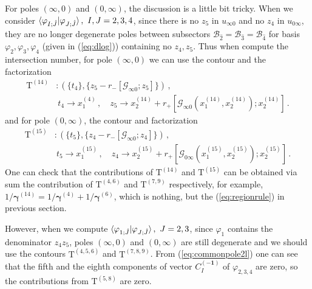 \documentclass[a4paper,11pt]{article}
\newcommand{\nn}{\nonumber}
\newcommand{\nT}{\mathrm{T}}
\newcommand{\mG}{\mathcal{G}}
\def\eref#1{(\ref{#1})}
\begin{document}
For poles $(\infty,0)$ and $(0,\infty)$, the discussion is a little bit tricky. When we consider $\braket{\varphi_{I;\hat{J}}|\varphi_{J;\hat{J}}},\  I,J=2,3,4$, since there is no $z_5$ in $u_{\infty 0 }$ and no $z_4$ in $u_{0 \infty }$, they are no longer degenerate poles  between subsectors $\mathcal{B}_{\hat{2}}=\mathcal{B}_{\hat{3}}=\mathcal{B}_{\hat{4}}$ for basis $\varphi_{2}, \varphi_{3},\varphi_{4}$ (given in \eref{eq:dlog}) containing no $z_4, z_5$. 
Thus when compute the intersection number, for pole $(\infty,0)$ we can use  the contour 
and the factorization 
 \begin{align}
\nT^{(14)} &: (\{t_4\} , \{z_5-r_-[\mG_{\infty0};z_5]\}) \,,\nn\\
&~t_4 \to x_1^{(4)} \,, \quad z_5\to  x_2^{(14)} +  r_{+}[\mG_{\infty0}(x_1^{(14)},x_2^{(14)});x_2^{(14)}] \,.
\end{align}
and  for pole $(0,\infty)$, the contour and factorization   
\begin{align}
\nT^{(15)} &: (\{t_5\} , \{z_4-r_-[\mG_{\infty0};z_4]\}) \,,\nn\\
&~t_5 \to x_1^{(15)} \,, \quad z_4\to  x_2^{(15)} +  r_{+}[\mG_{0\infty}(x_1^{(15)},x_2^{(15)});x_2^{(15)}] \,.
\end{align}
%
One can check that the contributions of  $\nT^{(14)}$ and $\nT^{(15)}$ can be obtained via sum the contribution of $\nT^{(4,6)}$
and $\nT^{(7,9)}$ respectively, for example, $1/\bm{\gamma}^{(14)} = 1/\bm{\gamma}^{(4)} +1/\bm{\gamma}^{(6)}$, which is nothing, but the \eref{eq:regionrule} in previous section.

However, when we compute $\braket{\varphi_{1;\hat{J}}|\varphi_{J;\hat{J}}},\  J=2,3$, since $\varphi_{1}$ contains
the denominator $z_4z_5$, poles $(\infty,0)$ and $(0,\infty)$ are still degenerate and we should use the 
contours $\nT^{(4,5,6)}$
and $\nT^{(7,8,9)}$. From \eref{eq:commonpole2l} one can see that the fifth and the eighth components of vector $C^{(\bm{-1})}_I$ of $\varphi_{2,3,4}$ are zero, so the contributions from $\nT^{(5,8)}$ are zero. 
\end{document}
